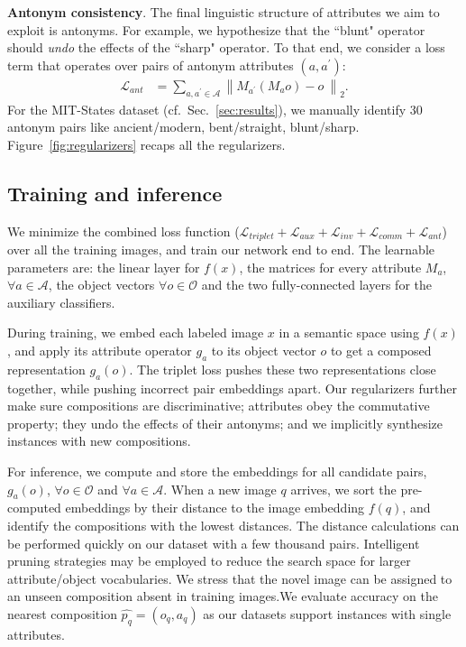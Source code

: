 \documentclass[runningheads]{llncs}
\begin{document}
\vspace{0.05in}
\noindent\textbf{Antonym consistency}. 
The final linguistic structure of attributes we aim to exploit is antonyms. For example, we hypothesize that the ``blunt" operator should \emph{undo} the effects of the ``sharp" operator.  To that end, we consider a loss term that operates over pairs of antonym attributes $(a,a^\prime)$:\vspace*{-0.1in}
\begin{align}
\mathcal{L}_{ant} &= \sum_{a, a^\prime \in \mathcal{A}} \left \| M_{a^\prime}(M_ao) - o \ \right \|_2.
\end{align}
For the MIT-States dataset (cf.~Sec.~\ref{sec:results}), we manually identify 30 antonym pairs like ancient/modern, bent/straight, blunt/sharp.
Figure~\ref{fig:regularizers} recaps all the regularizers.

\subsection{Training and inference} \label{sec:training_methodology}

We minimize the combined loss function ($\mathcal{L}_{triplet}+\mathcal{L}_{aux} + \mathcal{L}_{inv} + \mathcal{L}_{comm} + \mathcal{L}_{ant}$) over all the training images, and train our network end to end. The learnable parameters are: the linear layer for $f(x)$, the matrices for every attribute $M_a$, $\forall a \in \mathcal{A}$, the object vectors $\forall o \in \mathcal{O}$ and the two fully-connected layers for the auxiliary classifiers.

During training, we embed each labeled image $x$ in a semantic space using $f(x)$, and apply its attribute operator $g_a$ to its object vector $o$ to get a composed representation $g_a(o)$.  The triplet loss pushes these two representations close together, while pushing incorrect pair embeddings apart. Our regularizers further make sure compositions are discriminative; attributes obey the commutative property; they undo the effects of their antonyms; and we implicitly synthesize instances with new compositions. 

For inference, we compute and store the embeddings for all candidate pairs, $g_a(o)$, $\forall o \in \mathcal{O}$ and $\forall a \in \mathcal{A}$. When a new image $q$ arrives, we sort the pre-computed embeddings by their distance to the image embedding $f(q)$, and identify the compositions with the lowest distances. The distance calculations can be performed quickly on our dataset with a few thousand pairs. Intelligent pruning strategies may be employed to reduce the search space for larger attribute/object vocabularies. We stress that the novel image can be assigned to an unseen composition absent in training images.We evaluate accuracy on the nearest composition $\hat{p_q} = (o_q, a_q)$ as our datasets support instances with single attributes.  \vspace*{-0.1in}
\end{document}
